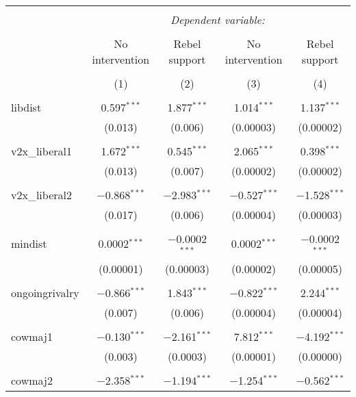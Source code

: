 
\begin{table}[!htbp] \centering 
  \caption{} 
  \label{} 
\begin{tabular}{@{\extracolsep{5pt}}lcccc} 
\\[-1.8ex]\hline 
\hline \\[-1.8ex] 
 & \multicolumn{4}{c}{\textit{Dependent variable:}} \\ 
\cline{2-5} 
\\[-1.8ex] & No intervention & Rebel support & No intervention & Rebel support \\ 
\\[-1.8ex] & (1) & (2) & (3) & (4)\\ 
\hline \\[-1.8ex] 
 libdist & 0.597$^{***}$ & 1.877$^{***}$ & 1.014$^{***}$ & 1.137$^{***}$ \\ 
  & (0.013) & (0.006) & (0.00003) & (0.00002) \\ 
  & & & & \\ 
 v2x\_liberal1 & 1.672$^{***}$ & 0.545$^{***}$ & 2.065$^{***}$ & 0.398$^{***}$ \\ 
  & (0.013) & (0.007) & (0.00002) & (0.00002) \\ 
  & & & & \\ 
 v2x\_liberal2 & $-$0.868$^{***}$ & $-$2.983$^{***}$ & $-$0.527$^{***}$ & $-$1.528$^{***}$ \\ 
  & (0.017) & (0.006) & (0.00004) & (0.00003) \\ 
  & & & & \\ 
 mindist & 0.0002$^{***}$ & $-$0.0002$^{***}$ & 0.0002$^{***}$ & $-$0.0002$^{***}$ \\ 
  & (0.00001) & (0.00003) & (0.00002) & (0.00005) \\ 
  & & & & \\ 
 ongoingrivalry & $-$0.866$^{***}$ & 1.843$^{***}$ & $-$0.822$^{***}$ & 2.244$^{***}$ \\ 
  & (0.007) & (0.006) & (0.00004) & (0.00004) \\ 
  & & & & \\ 
 cowmaj1 & $-$0.130$^{***}$ & $-$2.161$^{***}$ & 7.812$^{***}$ & $-$4.192$^{***}$ \\ 
  & (0.003) & (0.0003) & (0.00001) & (0.00000) \\ 
  & & & & \\ 
 cowmaj2 & $-$2.358$^{***}$ & $-$1.194$^{***}$ & $-$1.254$^{***}$ & $-$0.562$^{***}$ \\ 

\end{tabular}
\end{table}
